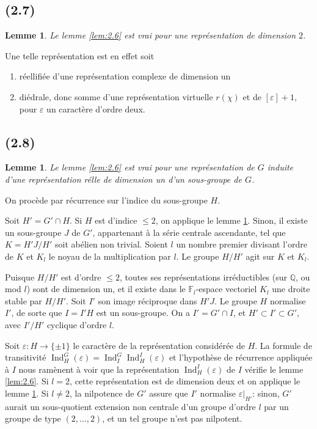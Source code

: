 \documentclass[11pt]{amsart}
\theoremstyle{plain}
\newtheorem{lemme}[theoreme]{Lemme}
\theoremstyle{definition}
\DeclareMathOperator{\Ind}{Ind}
\newcommand{\Q}{\mathbb{Q}}
\newcommand{\F}{\mathbb{F}}
\begin{document}
\subsection{(2.7)}
\begin{lemme}\label{lem:2.7}
Le lemme \ref{lem:2.6} est vrai pour une repr\'esentation de dimension $2$.
\end{lemme}

Une telle repr\'esentation est en effet soit
\begin{enumerate}
\item[(a)] r\'eellifi\'ee d'une repr\'esentation complexe de dimension un
\item[(b)] di\'edrale, donc somme d'une repr\'esentation virtuelle $r(\chi)$ et de $[\varepsilon]+1$, pour $\varepsilon$ un caract\`ere d'ordre deux.
\end{enumerate}

\subsection{(2.8)}
\begin{lemme}\label{lem:2.8}
Le lemme \ref{lem:2.6} est vrai pour une repr\'esentation de $G$ induite d'une repr\'esentation r\'elle de dimension un d'un sous-groupe de $G$.
\end{lemme}

On proc\`ede par r\'ecurrence sur l'indice du sous-groupe $H$.

Soit $H'=G'\cap H$. Si $H$ est d'indice $\le2$, on applique le lemme \ref{lem:2.7}. Sinon, il existe un sous-groupe $J$ de $G'$, appartenant \`a la s\'erie centrale ascendante, tel que $K=H'J/H'$ soit ab\'elien non trivial. Soient $l$ un nombre premier divisant l'ordre de $K$ et $K_l$ le noyau de la multiplication par $l$. Le groupe $H/H'$ agit sur $K$ et $K_l$.

Puisque $H/H'$ est d'ordre $\le2$, toutes ses repr\'esentations irr\'eductibles (sur $\Q$, ou mod $l$) sont de dimension un, et il existe dans le $\F_l$-espace vectoriel $K_l$ une droite stable par $H/H'$. Soit $I'$ son image r\'eciproque dans $H'J$. Le groupe $H$ normalise $I'$, de sorte que $I=I'H$ est un sous-groupe. On a $I'=G'\cap I$, et $H'\subset I'\subset G'$, avec $I'/H'$ cyclique d'ordre $l$.

Soit $\varepsilon\colon H\to\{\pm1\}$ le caract\`ere de la repr\'esentation consid\'er\'ee de $H$. La formule de transitivit\'e $\Ind_H^G(\varepsilon)=\Ind_I^G\Ind_H^I(\varepsilon)$ et l'hypoth\`ese de r\'ecurrence appliqu\'ee \`a $I$ nous ram\`enent \`a voir que la repr\'esentation $\Ind_H^I(\varepsilon)$ de $I$ v\'erifie le lemme \ref{lem:2.6}. Si $l=2$, cette repr\'esentation est de dimension deux et on applique le lemme \ref{lem:2.7}. Si $l\neq2$, la nilpotence de $G'$ assure que $I'$ normalise $\varepsilon|_{H'}$: sinon, $G'$ aurait un sous-quotient extension non centrale d'un groupe d'ordre $l$ par un groupe de type $(2,\ldots,2)$, et un tel groupe n'est pas nilpotent.
\end{document}
